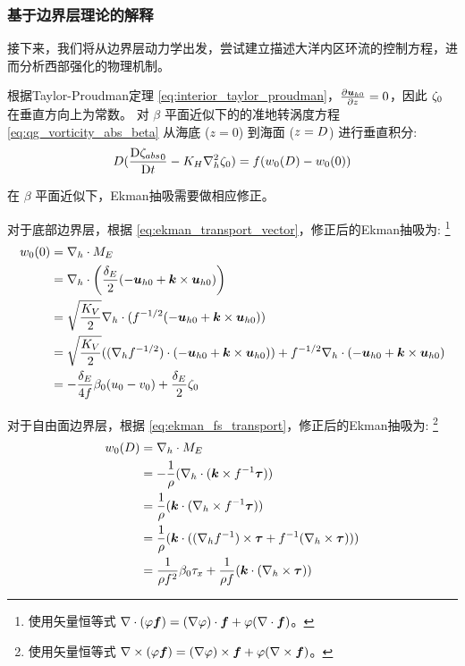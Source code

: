 \subsubsection{基于边界层理论的解释}

接下来，我们将从边界层动力学出发，尝试建立描述大洋内区环流的控制方程，进而分析西部强化的物理机制。

根据Taylor-Proudman定理 \eqref{eq:interior_taylor_proudman}，$\pde{\vel_{h0}}{z} = 0$，因此 $\zeta_0$ 在垂直方向上为常数。
对 $\beta$ 平面近似下的的准地转涡度方程 \eqref{eq:qg_vorticity_abs_beta} 从海底 ($z = 0$) 到海面 ($z = D$) 进行垂直积分:
\begin{equation}
    D (\frac{\mathrm{D} {\zeta_{abs}}_0}{\mathrm{D} t} - K_H \nabla_h^2 \zeta_0) = f (w_0(D) - w_0(0))
    \label{eq:qg_vorticity_integrated}
\end{equation}

在 $\beta$ 平面近似下，Ekman抽吸需要做相应修正。

对于底部边界层，根据 \eqref{eq:ekman_transport_vector}，修正后的Ekman抽吸为:
\footnote{使用矢量恒等式 $\nabla \cdot (\varphi \bm{f}) = (\nabla \varphi) \cdot \bm{f} + \varphi (\nabla \cdot \bm{f})$。}
\begin{align*}
    w_0(0) &= \nabla_h \cdot M_E \\
    &= \nabla_h \cdot \left(\frac{\delta_E}{2} (-\bm{u}_{h0} + \bm{k} \times \bm{u}_{h0})\right) \\
    &= \sqrt{\frac{K_V}{2}} \nabla_h \cdot (f^{-1/2} (-\bm{u}_{h0} + \bm{k} \times \bm{u}_{h0})) \\
    &= \sqrt{\frac{K_V}{2}} ((\nabla_h f^{-1/2}) \cdot (-\bm{u}_{h0} + \bm{k} \times \bm{u}_{h0})) + f^{-1/2} \nabla_h \cdot (-\bm{u}_{h0} + \bm{k} \times \bm{u}_{h0}) \\
    &= -\frac{\delta_E}{4 f} \beta_0 (u_0 - v_0) + \frac{\delta_E}{2} \zeta_0
\end{align*}

对于自由面边界层，根据 \eqref{eq:ekman_fs_transport}，修正后的Ekman抽吸为:
\footnote{使用矢量恒等式 $\nabla \times (\varphi \bm{f}) = (\nabla \varphi) \times \bm{f} + \varphi (\nabla \times \bm{f})$。}
\begin{align*}
    w_0(D) &= \nabla_h \cdot M_E \\
    &= -\frac{1}{\rho} (\nabla_h \cdot (\bm{k} \times f^{-1} {\bm{\tau}})) \\
    &= \frac{1}{\rho} (\bm{k} \cdot (\nabla_h \times f^{-1} {\bm{\tau}})) \\
    &= \frac{1}{\rho} (\bm{k} \cdot ((\nabla_h f^{-1}) \times {\bm{\tau}} + f^{-1} (\nabla_h \times {\bm{\tau}}))) \\
    &= \frac{1}{\rho f^2} \beta_0 \tau_x + \frac{1}{\rho f} (\bm{k} \cdot (\nabla_h \times {\bm{\tau}}))
\end{align*}

